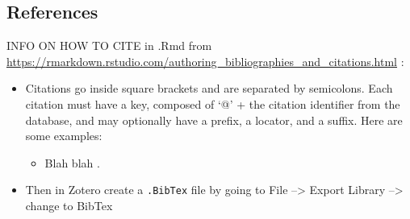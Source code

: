 \documentclass[]{article}
\providecommand{\tightlist}{%
  \setlength{\itemsep}{0pt}\setlength{\parskip}{0pt}}
\begin{document}
\hypertarget{references}{%
\subsection{References}\label{references}}

INFO ON HOW TO CITE in .Rmd from
\url{https://rmarkdown.rstudio.com/authoring_bibliographies_and_citations.html}
:

\begin{itemize}
\tightlist
\item
  Citations go inside square brackets and are separated by semicolons.
  Each citation must have a key, composed of `@' + the citation
  identifier from the database, and may optionally have a prefix, a
  locator, and a suffix. Here are some examples:

  \begin{itemize}
  \tightlist
  \item
    Blah blah \citep{isles_modeling_2017}.
  \end{itemize}
\item
  Then in Zotero create a \texttt{.BibTex} file by going to File
  --\textgreater{} Export Library --\textgreater{} change to BibTex
\end{itemize}


\end{document}
